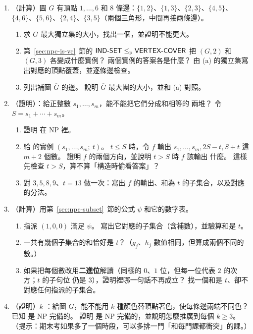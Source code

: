 \begin{enumerate}
\item （計算）圖 $G$ 有頂點 $1, \ldots, 6$ 和 $8$ 條邊：$\{1, 2\}$、$\{1, 3\}$、$\{2, 3\}$、$\{4, 5\}$、
$\{4, 6\}$、$\{5, 6\}$、$\{2, 4\}$、$\{3, 5\}$（兩個三角形，中間再接兩條邊）。
\begin{enumerate}
\item 求 $G$ 最大獨立集的大小，找出一個，並證明不能更大。
\item 第~\ref{sec:npc-is-vc}~節的 $\textsf{IND-SET} \le_{\mathrm{p}} \textsf{VERTEX-COVER}$ 把 $(G, 2)$ 和
$(G, 3)$ 各變成什麼實例？ 兩個實例的答案各是什麼？ 由 (a) 的獨立集寫出對應的頂點覆蓋，並逐條邊檢查。
\item 列出補圖 $\overline{G}$ 的邊。 說明 $\overline{G}$ 最大團的大小，並和 (a) 對照。
\end{enumerate}

\item \label{q:npc-partition}（證明）：給正整數 $s_1, \ldots, s_m$，能不能把它們分成和相等的
兩堆？ 令 $S = s_1 + \cdots + s_m$。
\begin{enumerate}
\item 證明  在 NP 裡。
\item 給  的實例 $(s_1, \ldots, s_m;\ t)$。 $t \le S$ 時，令 $f$ 輸出
$s_1, \ldots, s_m, 2S - t, S + t$ 這 $m + 2$ 個數。 證明 $f$ 的兩個方向，並說明 $t > S$ 時 $f$ 該輸出
什麼。 這樣先檢查 $t > S$，算不算「構造時偷看答案」？
\item 對 $3, 5, 8, 9$、$t = 13$ 做一次：寫出 $f$ 的輸出、和為 $t$ 的子集合，以及對應的分法。
\end{enumerate}

\item （計算）用第~\ref{sec:npc-subset}~節的公式 $\psi$ 和它的數字表。
\begin{enumerate}
\item 指派 $(1, 0, 0)$ 滿足 $\psi$。 寫出它對應的子集合（含補數），並驗算和是 $t$。
\item 一共有幾個子集合的和恰好是 $t$？（$g_j$、$h_j$ 數值相同，但算成兩個不同的數。）
\item 如果把每個數改用\textbf{二進位}解讀（同樣的 $0$、$1$ 位，但每一位代表 $2$ 的次方；$t$ 的子句位
仍是 $3$），證明裡哪一句話不再成立？ 找一個和是 $t$、卻不對應任何指派的子集合。
\end{enumerate}

\item （證明）$k$-：給圖 $G$，能不能用 $k$ 種顏色替頂點著色，使每條邊兩端不同色？ 已知
 是 NP 完備的。 證明  是 NP 完備的，並說明怎麼推廣到每個 $k \ge 3$。
（提示：期末考如果多了一個時段，可以多排一門「和每門課都衝突」的課。）


\end{enumerate}

